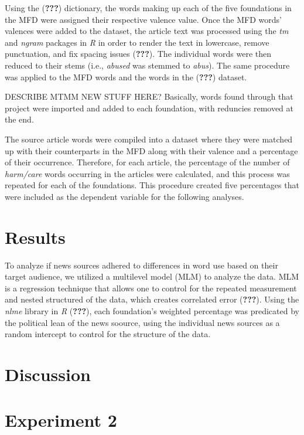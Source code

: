 \documentclass[,man]{apa6}
\theoremstyle{definition}
\theoremstyle{definition}
\theoremstyle{definition}
\theoremstyle{remark}
\begin{document}
Using the ({\textbf{???}}) dictionary, the words making up each of the
five foundations in the MFD were assigned their respective valence
value. Once the MFD words' valences were added to the dataset, the
article text was processed using the \emph{tm} and \emph{ngram} packages
in \emph{R} in order to render the text in lowercase, remove
punctuation, and fix spacing issues ({\textbf{???}}). The individual
words were then reduced to their stems (i.e., \emph{abused} was stemmed
to \emph{abus}). The same procedure was applied to the MFD words and the
words in the ({\textbf{???}}) dataset.

DESCRIBE MTMM NEW STUFF HERE? Basically, words found through that
project were imported and added to each foundation, with reduncies
removed at the end.

The source article words were compiled into a dataset where they were
matched up with their counterparts in the MFD along with their valence
and a percentage of their occurrence. Therefore, for each article, the
percentage of the number of \emph{harm/care} words occurring in the
articles were calculated, and this process was repeated for each of the
foundations. This procedure created five percentages that were included
as the dependent variable for the following analyses.

\hypertarget{results}{%
\section{Results}\label{results}}

To analyze if news sources adhered to differences in word use based on
their target audience, we utilized a multilevel model (MLM) to analyze
the data. MLM is a regression technique that allows one to control for
the repeated measurement and nested structured of the data, which
creates correlated error ({\textbf{???}}). Using the \emph{nlme} library
in \emph{R} ({\textbf{???}}), each foundation's weighted percentage was
predicated by the political lean of the news soource, using the
individual news sources as a random intercept to control for the
structure of the data.

\hypertarget{discussion}{%
\section{Discussion}\label{discussion}}

\hypertarget{experiment-2}{%
\section{Experiment 2}\label{experiment-2}}
\end{document}
